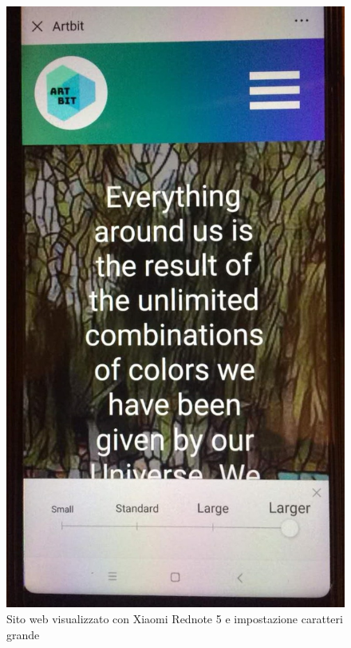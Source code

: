\documentclass[openany, a4paper, 12pt]{report}
\begin{document}
			\begin{figure}[H]
				\centering
				\includegraphics[width=0.5\linewidth]{images/big_font}
				\caption{Sito web visualizzato con Xiaomi Rednote 5 e impostazione caratteri grande}
			\end{figure}
\end{document}
